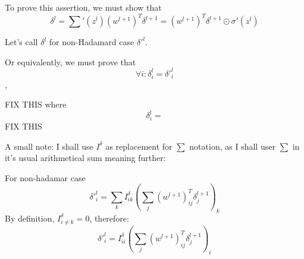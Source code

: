\documentclass{article}
\begin{document}
To prove this assertion, we must show that 
$$\delta^l = {\sum}'(z^l) (w^{l+1})^{T} \delta^{l+1} = (w^{l+1})^{T} \delta^{l+1}\odot\sigma'(z^l)$$

Let's call $\delta^l$ for non-Hadamard case $\delta'^l$.

Or equivalently, we must prove that $$\forall i: \delta^l_i = \delta'^l_i$$,

FIX THIS
where $$\delta^l_i = $$
FIX THIS

A small note: I shall use $I^{\delta}$ as replacement for $\sum$ notation, as I shall user $\sum$ in it's usual arithmetical sum meaning further:

For non-hadamar case
$$\delta'^l_i = \sum_k I^{\delta}_{ik} (\sum_j(w^{l+1})^T_{ij} \delta^{l+1}_j)_k$$
By definition, $I^{\delta}_{i \neq k} = 0$, therefore:
$$\delta'^l_i = I^{\delta}_{ii} (\sum_j(w^{l+1})^T_{ij} \delta^{l+1}_j)_i$$
\end{document}
